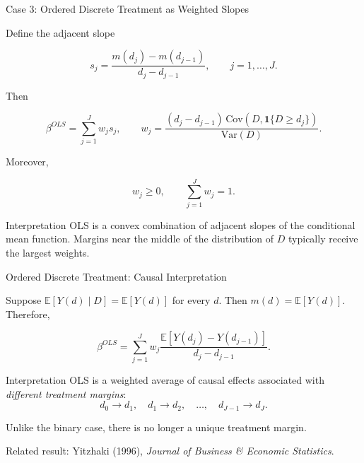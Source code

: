 \documentclass[aspectratio=169,11pt]{beamer}
\begin{document}
\begin{frame}{Case 3: Ordered Discrete Treatment as Weighted Slopes}
\small

Define the adjacent slope

\[
s_j
=
\frac{
m(d_j)-m(d_{j-1})
}{
d_j-d_{j-1}
},
\qquad j=1,\ldots,J.
\]

Then

\[
\boxed{
\beta^{OLS}
=
\sum_{j=1}^{J} w_j s_j,
}
\qquad
w_j
=
\frac{
(d_j-d_{j-1})
\,\mathrm{Cov}
\left(
D,\mathbf{1}\{D\geq d_j\}
\right)
}{
\mathrm{Var}(D)
}.
\]

Moreover,

\[
w_j\geq 0,
\qquad
\sum_{j=1}^{J}w_j=1.
\]

\begin{block}{Interpretation}
OLS is a convex combination of adjacent slopes of the conditional
mean function. Margins near the middle of the distribution of \(D\)
typically receive the largest weights.
\end{block}

\end{frame}


\begin{frame}{Ordered Discrete Treatment: Causal Interpretation}
\small

Suppose
\(\mathbb{E}[Y(d)\mid D]=\mathbb{E}[Y(d)]\) for every \(d\).
Then \(m(d)=\mathbb{E}[Y(d)]\). Therefore,

\[
\boxed{
\beta^{OLS}
=
\sum_{j=1}^{J}
w_j
\frac{
\mathbb{E}[Y(d_j)-Y(d_{j-1})]
}{
d_j-d_{j-1}
}.
}
\]

\begin{block}{Interpretation}
OLS is a weighted average of causal effects associated with
\emph{different treatment margins}:
\[
d_0\rightarrow d_1,\quad
d_1\rightarrow d_2,\quad
\ldots,\quad
d_{J-1}\rightarrow d_J.
\]
\end{block}

Unlike the binary case, there is no longer a unique treatment margin.

\medskip

\scriptsize
Related result: Yitzhaki (1996), \emph{Journal of Business \& Economic Statistics}.

\end{frame}
\end{document}
